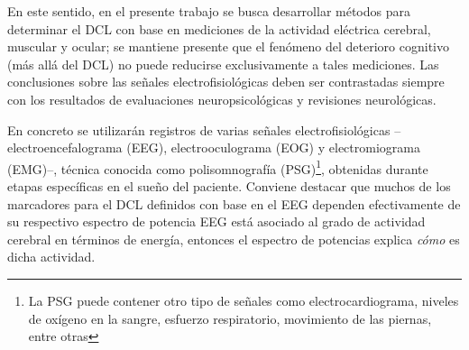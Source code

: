 En este sentido, en el presente trabajo se busca desarrollar métodos para determinar el DCL con base en mediciones de la actividad eléctrica cerebral, muscular y ocular; se mantiene presente que el fenómeno del deterioro cognitivo (más allá del DCL) no puede reducirse exclusivamente a tales mediciones. 
%
Las conclusiones sobre las señales electrofisiológicas deben ser contrastadas siempre con los resultados de evaluaciones neuropsicológicas y revisiones neurológicas.

En concreto se utilizarán registros de varias señales electrofisiológicas --electroencefalograma (EEG), electrooculograma (EOG) y electromiograma (EMG)--, técnica conocida como polisomnografía (PSG)\footnote{La 
PSG puede contener otro tipo de señales como electrocardiograma, niveles de oxígeno en la sangre, 
esfuerzo respiratorio, movimiento de las piernas, entre otras}, obtenidas durante 
etapas específicas en el sueño del paciente.
%
Conviene destacar que muchos de los marcadores para el DCL definidos con base en el EEG dependen
efectivamente de su respectivo espectro de potencia%
EEG está asociado al grado de actividad cerebral en términos de energía, entonces el espectro de 
potencias explica \textit{cómo} es dicha actividad.%
